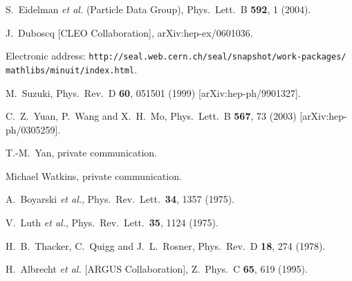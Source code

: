\documentclass{cornell}
\begin{document}
\begin{thebibliography}{99}
S.~Eidelman {\it et al.}  (Particle Data Group),
Phys.\ Lett.\ B {\bf 592}, 1 (2004).

J.~Duboscq  [CLEO Collaboration],
  arXiv:hep-ex/0601036.

Electronic address: {\tt http://seal.web.cern.ch/seal/snapshot/work-packages/
mathlibs/minuit/index.html}.

M.~Suzuki,
  Phys.\ Rev.\ D {\bf 60}, 051501 (1999)
  [arXiv:hep-ph/9901327].

C.~Z.~Yuan, P.~Wang and X.~H.~Mo,
  Phys.\ Lett.\ B {\bf 567}, 73 (2003)
  [arXiv:hep-ph/0305259].

T.-M.~Yan, private communication.

Michael Watkins, private communication.

A.~Boyarski {\it et al.},
  Phys.\ Rev.\ Lett.\  {\bf 34}, 1357 (1975).

V.~Luth {\it et al.},
  Phys.\ Rev.\ Lett.\  {\bf 35}, 1124 (1975).

H.~B.~Thacker, C.~Quigg and J.~L.~Rosner,
  Phys.\ Rev.\ D {\bf 18}, 274 (1978).

H.~Albrecht {\it et al.}  [ARGUS Collaboration],
  Z.\ Phys.\ C {\bf 65}, 619 (1995).

\end{thebibliography}
\end{document}
